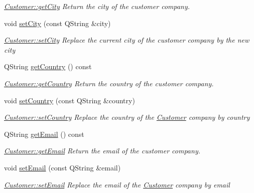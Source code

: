\begin{DoxyCompactItemize}
\begin{DoxyCompactList}\small\item\em \hyperlink{classModels_1_1Customer_ace3f86c1e5108ede84a1a09516b37e50}{Customer\+::get\+City} Return the city of the customer company. \end{DoxyCompactList}\item 
void \hyperlink{classModels_1_1Customer_a069b40292e037762ec5e5836682c50b0}{set\+City} (const Q\+String \&city)
\begin{DoxyCompactList}\small\item\em \hyperlink{classModels_1_1Customer_a069b40292e037762ec5e5836682c50b0}{Customer\+::set\+City} Replace the current city of the customer company by the new {\itshape city} \end{DoxyCompactList}\item 
Q\+String \hyperlink{classModels_1_1Customer_a70ecabd20451f2b7c24d22a931c94cc3}{get\+Country} () const 
\begin{DoxyCompactList}\small\item\em \hyperlink{classModels_1_1Customer_a70ecabd20451f2b7c24d22a931c94cc3}{Customer\+::get\+Country} Return the country of the customer company. \end{DoxyCompactList}\item 
void \hyperlink{classModels_1_1Customer_afd430475dc1bf7f9b1548767265aa821}{set\+Country} (const Q\+String \&country)
\begin{DoxyCompactList}\small\item\em \hyperlink{classModels_1_1Customer_afd430475dc1bf7f9b1548767265aa821}{Customer\+::set\+Country} Replace the country of the \hyperlink{classModels_1_1Customer}{Customer} company by {\itshape country} \end{DoxyCompactList}\item 
Q\+String \hyperlink{classModels_1_1Customer_ac8d55fcc6f53b2269a01efbe43e75133}{get\+Email} () const 
\begin{DoxyCompactList}\small\item\em \hyperlink{classModels_1_1Customer_ac8d55fcc6f53b2269a01efbe43e75133}{Customer\+::get\+Email} Return the email of the customer company. \end{DoxyCompactList}\item 
void \hyperlink{classModels_1_1Customer_ab8f728a2e05c5c9c7a6f6522b85a59a1}{set\+Email} (const Q\+String \&email)
\begin{DoxyCompactList}\small\item\em \hyperlink{classModels_1_1Customer_ab8f728a2e05c5c9c7a6f6522b85a59a1}{Customer\+::set\+Email} Replace the email of the \hyperlink{classModels_1_1Customer}{Customer} company by {\itshape email} \end{DoxyCompactList}\item 

\end{DoxyCompactItemize}
